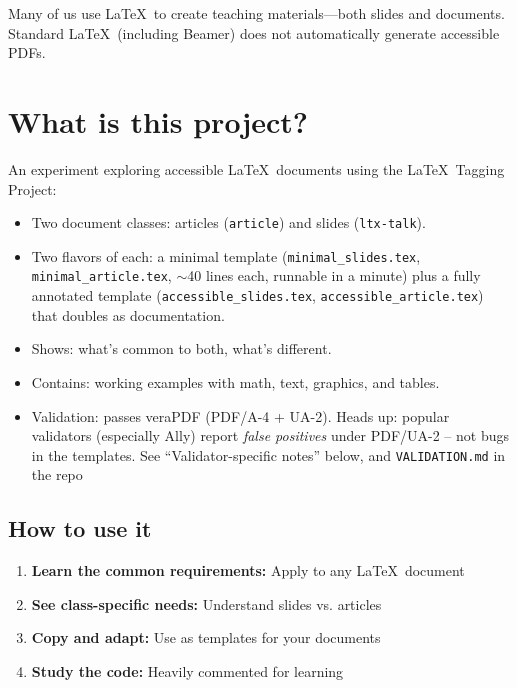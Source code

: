\documentclass{article}
\newcommand\RedText[1]{\textcolor{AccessibleRed}{#1}}
\newcommand\GreenText[1]{\textcolor{AccessibleGreen}{#1}}
\begin{document}
\noindent Many of us use \LaTeX\ to create teaching materials---both slides and documents. Standard \LaTeX\ (including Beamer) does not automatically generate accessible PDFs.

\section{What is this project?}

An experiment exploring accessible \LaTeX\ documents using the \LaTeX\ Tagging Project:

\begin{itemize}
\item \GreenText{Two document classes:} articles (\texttt{article}) and slides (\texttt{ltx-talk}).
\item \GreenText{Two flavors of each:} a minimal template (\texttt{minimal\_slides.tex}, \texttt{minimal\_article.tex}, $\sim$40 lines each, runnable in a minute) plus a fully annotated template (\texttt{accessible\_slides.tex}, \texttt{accessible\_article.tex}) that doubles as documentation.
\item \GreenText{Shows:} what's common to both, what's different.
\item \GreenText{Contains:} working examples with math, text, graphics, and tables.
\item \GreenText{Validation:} passes veraPDF (PDF/A-4 + UA-2). \RedText{Heads up:} popular validators (especially Ally) report \emph{false positives} under PDF/UA-2 -- not bugs in the templates. See ``Validator-specific notes'' below, and \texttt{VALIDATION.md} in the repo
\end{itemize}

\subsection{How to use it}

\begin{enumerate}
\item \textbf{Learn the common requirements:} Apply to any \LaTeX\ document
\item \textbf{See class-specific needs:} Understand slides vs. articles
\item \textbf{Copy and adapt:} Use as templates for your documents
\item \textbf{Study the code:} Heavily commented for learning
\end{enumerate}

\bigskip
\end{document}
